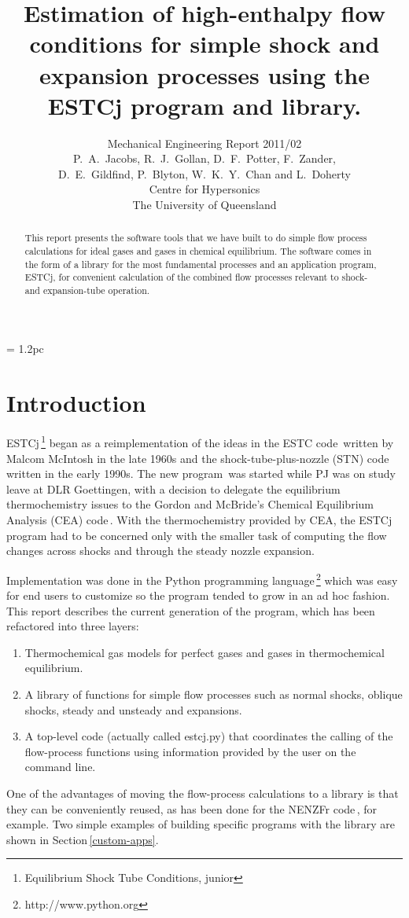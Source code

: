 \documentclass[10pt,a4paper]{article}
\title{
  Estimation of high-enthalpy flow conditions
  for simple shock and expansion processes using
  the ESTCj program and library.
}
\author{
  Mechanical Engineering Report 2011/02 \\
  P.~A.~Jacobs, R.~J.~Gollan, D.~F.~Potter, F.~Zander,\\
  D.~E.~Gildfind, P.~Blyton, W.~K.~Y.~Chan and L.~Doherty \\
  Centre for Hypersonics\\
  The University of Queensland
}
\begin{document}
\maketitle

\baselineskip = 1.2pc

\begin{abstract}
This report presents the software tools that we have built to do simple
flow process calculations for ideal gases and gases in chemical equilibrium.
The software comes in the form of a library for the most fundamental processes and
an application program, ESTCj, for convenient calculation of 
the combined flow processes relevant to shock- and expansion-tube operation.
\end{abstract}

\bigskip
\tableofcontents


\newpage
\section{Introduction}
%
ESTCj\,\footnote{Equilibrium Shock Tube Conditions, junior} 
began as a reimplementation of the ideas in the ESTC code\,\cite{mcintosh_70}
written by Malcom McIntosh in the late 1960s and 
the shock-tube-plus-nozzle (STN) code\,\cite{krek_jacobs_93} written in the early 1990s.
The new program\,\cite{jacobs_gardner_2003a} was started 
while PJ was on study leave at DLR Goettingen,
with a decision to delegate the equilibrium thermochemistry issues to the 
Gordon and McBride's Chemical Equilibrium Analysis (CEA) 
code\,\cite{gordon_mcbride_1994,mcbride_gordon_1996}.
With the thermochemistry provided by CEA, the ESTCj program had to be concerned
only with the smaller task of computing the flow changes across shocks and through
the steady nozzle expansion.

\medskip
Implementation was done in the Python programming language\,\footnote{http://www.python.org}
which was easy for end users to customize so the program tended to grow in an ad hoc fashion.
This report describes the current generation of the program, which has been refactored into
three layers:
\begin{enumerate}
 \item Thermochemical gas models for perfect gases and gases in thermochemical equilibrium.
 \item A library of functions for simple flow processes such as normal shocks, oblique shocks,
  steady and unsteady and expansions.
 \item A top-level code (actually called estcj.py) that coordinates the calling 
  of the flow-process functions using information provided by the user on the command line.
\end{enumerate}
One of the advantages of moving the flow-process calculations to a library is that 
they can be conveniently reused, 
as has been done for the NENZFr code\,\cite{doherty_etal_2012a}, for example.
Two simple examples of building specific programs with the library are shown in
Section\,\ref{custom-apps}.
\end{document}
